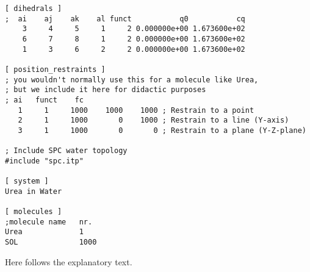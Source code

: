 {\begin{verbatim}
[ dihedrals ]
;  ai    aj    ak    al funct           q0           cq
    3     4     5     1     2 0.000000e+00 1.673600e+02 
    6     7     8     1     2 0.000000e+00 1.673600e+02 
    1     3     6     2     2 0.000000e+00 1.673600e+02 

[ position_restraints ]
; you wouldn't normally use this for a molecule like Urea,
; but we include it here for didactic purposes
; ai   funct    fc
   1     1     1000    1000    1000 ; Restrain to a point
   2     1     1000       0    1000 ; Restrain to a line (Y-axis)
   3     1     1000       0       0 ; Restrain to a plane (Y-Z-plane)

; Include SPC water topology
#include "spc.itp"

[ system ]
Urea in Water

[ molecules ]
;molecule name   nr.
Urea             1
SOL              1000
\end{verbatim}}

Here follows the explanatory text.

